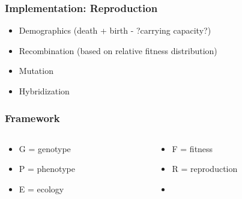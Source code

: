 \documentclass[serif,mathserif]{beamer}
\begin{document}
\begin{frame}
  \frametitle{Implementation: Reproduction}
  \begin{itemize}
  \item Demographics (death + birth - ?carrying capacity?)
  \item Recombination (based on relative fitness distribution)
  \item Mutation
  \item Hybridization
  \end{itemize}
\end{frame}

\begin{frame}
  \frametitle{Framework}
  \begin{center}
  \end{center}
  \begin{center}
    \begin{columns}
      \begin{column}{.5\linewidth}
        \begin{itemize}
        \item G = genotype
        \item P = phenotype
        \item E = ecology
        \end{itemize}
      \end{column}
      \begin{column}{.5\linewidth}
        \begin{itemize}
        \item F = fitness
        \item R = reproduction
        \item 
        \end{itemize}
      \end{column}
    \end{columns}
  \end{center}    
\end{frame}
\end{document}
